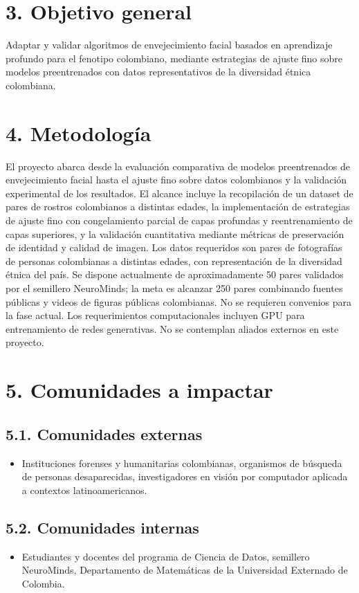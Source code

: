 \documentclass[a4paper,12pt]{article}
\begin{document}
\section*{3. Objetivo general}
Adaptar y validar algoritmos de envejecimiento facial basados en aprendizaje profundo para el fenotipo colombiano, mediante estrategias de ajuste fino sobre modelos preentrenados con datos representativos de la diversidad étnica colombiana.

\section*{4. Metodología}
El proyecto abarca desde la evaluación comparativa de modelos preentrenados de envejecimiento facial hasta el ajuste fino sobre datos colombianos y la validación experimental de los resultados. El alcance incluye la recopilación de un dataset de pares de rostros colombianos a distintas edades, la implementación de estrategias de ajuste fino con congelamiento parcial de capas profundas y reentrenamiento de capas superiores, y la validación cuantitativa mediante métricas de preservación de identidad y calidad de imagen. Los datos requeridos son pares de fotografías de personas colombianas a distintas edades, con representación de la diversidad étnica del país. Se dispone actualmente de aproximadamente 50 pares validados por el semillero NeuroMinds; la meta es alcanzar 250 pares combinando fuentes públicas y videos de figuras públicas colombianas. No se requieren convenios para la fase actual. Los requerimientos computacionales incluyen GPU para entrenamiento de redes generativas. No se contemplan aliados externos en este proyecto.

\section*{5. Comunidades a impactar}
\subsection*{5.1. Comunidades externas}
\begin{itemize}
    \item Instituciones forenses y humanitarias colombianas, organismos de búsqueda de personas desaparecidas, investigadores en visión por computador aplicada a contextos latinoamericanos.
\end{itemize}

\subsection*{5.2. Comunidades internas}
\begin{itemize}
    \item Estudiantes y docentes del programa de Ciencia de Datos, semillero NeuroMinds, Departamento de Matemáticas de la Universidad Externado de Colombia.
\end{itemize}
\end{document}
